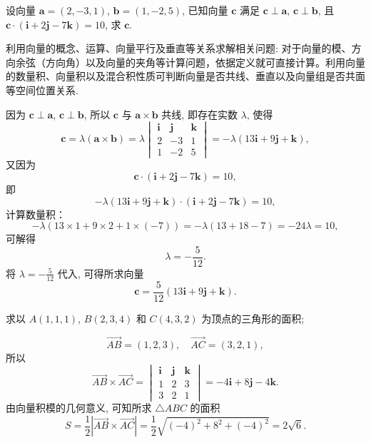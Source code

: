 \begin{problem}
    设向量 $\boldsymbol{a} = (2,-3,1)$, $\boldsymbol{b} = (1,-2,5)$, 已知向量 $\boldsymbol{c}$ 满足 $\boldsymbol{c} \perp \boldsymbol{a}$, $\boldsymbol{c} \perp \boldsymbol{b}$, 且 $\boldsymbol{c} \cdot (\boldsymbol{i} + 2\boldsymbol{j} - 7\boldsymbol{k}) = 10$, 求 $\boldsymbol{c}$.
\end{problem}
\begin{note}
     利用向量的概念、运算、向量平行及垂直等关系求解相关问题:
对于向量的模、方向余弦（方向角）以及向量的夹角等计算问题，依据定义就可直接计算。利用向量的数量积、向量积以及混合积性质可判断向量是否共线、垂直以及向量组是否共面等空间位置关系.
\end{note}
 \begin{solution}
     因为 $\boldsymbol{c} \perp \boldsymbol{a}$, $\boldsymbol{c} \perp \boldsymbol{b}$, 所以 $\boldsymbol{c}$ 与 $\boldsymbol{a} \times \boldsymbol{b}$ 共线, 即存在实数 $\lambda$, 使得
\[\boldsymbol{c} = \lambda (\boldsymbol{a} \times \boldsymbol{b}) = \lambda
\begin{vmatrix}
\boldsymbol{i} & \boldsymbol{j} & \boldsymbol{k} \\
2 & -3 & 1 \\
1 & -2 & 5
\end{vmatrix}
= -\lambda(13\boldsymbol{i} + 9\boldsymbol{j} + \boldsymbol{k}),\]
又因为\[\boldsymbol{c} \cdot (\boldsymbol{i} + 2\boldsymbol{j} - 7\boldsymbol{k}) = 10,\]
即\[
-\lambda(13\boldsymbol{i} + 9\boldsymbol{j} + \boldsymbol{k}) \cdot (\boldsymbol{i} + 2\boldsymbol{j} - 7\boldsymbol{k}) = 10,\]
计算数量积：\[
-\lambda(13 \times 1 + 9 \times 2 + 1 \times (-7)) = -\lambda(13 + 18 - 7) = -24\lambda = 10,\]
可解得\[
\lambda = -\frac{5}{12}.\]
将 $\lambda = -\frac{5}{12}$ 代入, 可得所求向量\[
\boldsymbol{c} = \frac{5}{12}(13\boldsymbol{i} + 9\boldsymbol{j} + \boldsymbol{k}).\]

 \end{solution}
    \begin{problem}
        求以 $A(1,1,1)$, $B(2,3,4)$ 和 $C(4,3,2)$ 为顶点的三角形的面积;
    \end{problem}
\begin{solution}
    \[
\overrightarrow{AB} = (1,2,3),\quad \overrightarrow{AC} = (3,2,1),
\]
所以
\[
\overrightarrow{AB} \times \overrightarrow{AC} =
\begin{vmatrix}
\boldsymbol{i} & \boldsymbol{j} & \boldsymbol{k} \\
1 & 2 & 3 \\
3 & 2 & 1
\end{vmatrix}
= -4\boldsymbol{i} + 8\boldsymbol{j} - 4\boldsymbol{k}.
\]
由向量积模的几何意义, 可知所求 $\triangle ABC$ 的面积
\[
S = \frac{1}{2} |\overrightarrow{AB} \times \overrightarrow{AC}|
= \frac{1}{2} \sqrt{(-4)^2 + 8^2 + (-4)^2}
= 2\sqrt{6}.
\]
\end{solution}
